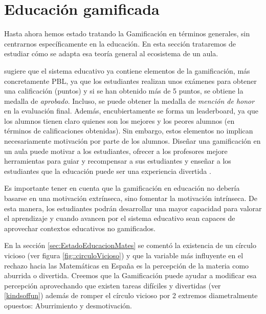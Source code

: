 \section{Educación gamificada}

Hasta ahora hemos estado tratando la Gamificación en términos generales, sin centrarnos específicamente en la educación. 
%
En esta sección trataremos de estudiar cómo se adapta esa teoría general al ecosistema de un aula.


\cite{lee2011gamification} sugiere que el sistema educativo ya contiene elementos de la gamificación, más concretamente \gls{PBL}, ya que los estudiantes realizan unos exámenes para obtener una calificación (puntos) y si se han obtenido más de 5 puntos, se obtiene la medalla de \textit{aprobado}.
%
Incluso, se puede obtener la medalla de \textit{mención de honor} en la evaluación final.
%
Además, encubiertamente se forma un leaderboard, ya que los alumnos tienen claro quienes son los mejores y los peores alumnos (en términos de calificaciones obtenidas).
%
Sin embargo, estos elementos no implican necesariamente motivación por parte de los alumnos.
%
Diseñar una gamificación en un aula puede motivar a los estudiantes, ofrecer a los profesores mejore herramientas para guiar y recompensar a sus estudiantes y enseñar a los estudiantes que la educación puede ser una experiencia divertida \cite{lee2011gamification}.

Es importante tener en cuenta que la gamificación en educación no debería basarse en una motivación extrínseca, sino fomentar la motivación intrínseca. 
%
De esta manera, los estudiantes podrán desarrollar una mayor capacidad para valorar el aprendizaje y cuando avancen por el sistema educativo sean capaces de aprovechar contextos educativos no gamificados. 

En la sección \ref{sec:EstadoEducacionMates} se comentó la existencia de un círculo vicioso (ver figura \ref{fig::circuloVicioso}) y que la variable más influyente en el rechazo hacia las Matemáticas en España es la percepción de la materia como aburrida o divertida.
%
Creemos que la Gamificación puede ayudar a modificar esa percepción aprovechando que existen tareas difíciles y divertidas (ver \ref{kindsoffun}) además de romper el círculo vicioso por 2 extremos diametralmente opuestos: Aburrimiento y desmotivación.


